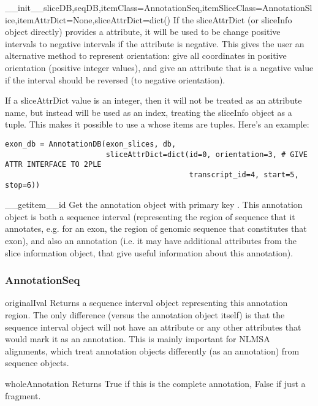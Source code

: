 \documentclass{howto}
\begin{document}
\begin{funcdesc}{__init__}{sliceDB,seqDB,itemClass=AnnotationSeq,itemSliceClass=AnnotationSlice,itemAttrDict=None,sliceAttrDict=dict()}
  If the sliceAttrDict (or sliceInfo object directly) provides a 
  attribute, it will be used to be change positive intervals to negative intervals
  if the  attribute is negative.  This gives the user an alternative
  method to represent orientation: give all coordinates in positive orientation
  (positive integer values), and give an  attribute that
  is a negative value if the interval should be reversed (to negative orientation).

  If a sliceAttrDict value is an integer, then it will not be treated as an
  attribute name, but instead will be used as an index, treating the sliceInfo
  object as a tuple.  This makes it possible to use a  whose
  items are tuples.  Here's an example:
\begin{verbatim}
exon_db = AnnotationDB(exon_slices, db,
                       sliceAttrDict=dict(id=0, orientation=3, # GIVE ATTR INTERFACE TO 2PLE
                                          transcript_id=4, start=5, stop=6))
\end{verbatim}
\end{funcdesc}

\begin{funcdesc}{__getitem__}{id}
  Get the annotation object with primary key .  This annotation object
  is both a sequence interval (representing the region of sequence that it
  annotates, e.g. for an exon, the region of genomic sequence that constitutes
  that exon), and also an annotation (i.e. it may have additional attributes
  from the slice information object, that give useful information about this
  annotation).
\end{funcdesc}

\subsubsection{AnnotationSeq}
\begin{funcdesc}{originalIval}{}
  Returns a sequence interval object representing this annotation region.
  The only difference (versus the annotation object itself) is that the
  sequence interval object will not have an  attribute or
  any other attributes that would mark it as an annotation.  This is mainly
  important for NLMSA alignments, which treat annotation objects differently
  (as an annotation) from sequence objects.
\end{funcdesc}

\begin{funcdesc}{wholeAnnotation}{}
  Returns True if this is the complete annotation, False if just a fragment.
\end{funcdesc}
\end{document}
